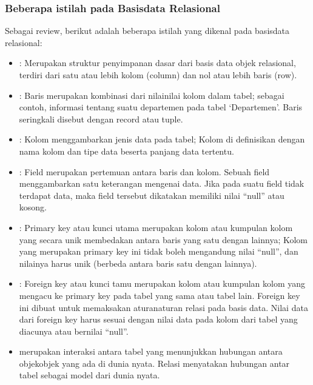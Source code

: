 \documentclass[letterpaper,10pt,english]{sphinxmanual}
\begin{document}
\subsubsection{Beberapa istilah pada Basisdata Relasional}
\label{\detokenize{sesi2/relationaldb:beberapa-istilah-pada-basisdata-relasional}}
Sebagai review, berikut adalah beberapa istilah yang dikenal pada basisdata relasional:
\begin{itemize}
\item {} 
: Merupakan struktur penyimpanan dasar dari basis data objek relasional, terdiri dari satu atau lebih kolom (column) dan nol atau lebih baris (row).

\item {} 
: Baris merupakan kombinasi dari nilai\sphinxhyphen{}nilai kolom dalam tabel; sebagai contoh, informasi tentang suatu departemen pada tabel ‘Departemen’. Baris seringkali disebut dengan record atau tuple.

\item {} 
: Kolom menggambarkan jenis data pada tabel; Kolom di definisikan dengan nama kolom dan tipe data beserta panjang data tertentu.

\item {} 
: Field merupakan pertemuan antara baris dan kolom. Sebuah field menggambarkan satu keterangan mengenai data. Jika pada suatu field tidak terdapat data, maka field tersebut dikatakan memiliki nilai “null” atau kosong.

\item {} 
: Primary key atau kunci utama merupakan kolom atau kumpulan kolom yang secara unik membedakan antara baris yang satu dengan lainnya; Kolom yang merupakan primary key ini tidak boleh mengandung nilai “null”, dan nilainya harus unik (berbeda antara baris satu dengan lainnya).

\item {} 
: Foreign key atau kunci tamu merupakan kolom atau kumpulan kolom yang mengacu ke primary key pada tabel yang sama atau tabel lain. Foreign key ini dibuat untuk memaksakan aturan\sphinxhyphen{}aturan relasi pada basis data. Nilai data dari foreign key harus sesuai dengan nilai data pada kolom dari tabel yang diacunya atau bernilai “null”.

\item {} 
 merupakan interaksi antara tabel yang menunjukkan hubungan antara objek\sphinxhyphen{}objek yang ada di dunia nyata. Relasi menyatakan hubungan antar tabel sebagai model dari dunia nyata.

\end{itemize}
\end{document}

